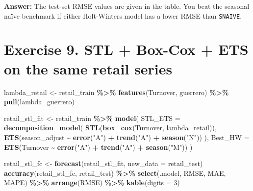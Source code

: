 \documentclass[
  11pt,
]{article}
\newenvironment{Shaded}{\begin{snugshade}}{\end{snugshade}}
\newcommand{\AttributeTok}[1]{\textcolor[rgb]{0.13,0.29,0.53}{#1}}
\newcommand{\DecValTok}[1]{\textcolor[rgb]{0.00,0.00,0.81}{#1}}
\newcommand{\FunctionTok}[1]{\textcolor[rgb]{0.13,0.29,0.53}{\textbf{#1}}}
\newcommand{\NormalTok}[1]{#1}
\newcommand{\OtherTok}[1]{\textcolor[rgb]{0.56,0.35,0.01}{#1}}
\newcommand{\SpecialCharTok}[1]{\textcolor[rgb]{0.81,0.36,0.00}{\textbf{#1}}}
\newcommand{\StringTok}[1]{\textcolor[rgb]{0.31,0.60,0.02}{#1}}
\begin{document}
\textbf{Answer:} The test-set RMSE values are given in the table. You
beat the seasonal naïve benchmark if either Holt-Winters model has a
lower RMSE than \texttt{SNAIVE}.

\section{Exercise 9. STL + Box-Cox + ETS on the same retail
series}\label{exercise-9.-stl-box-cox-ets-on-the-same-retail-series}

\begin{Shaded}
\begin{Highlighting}[]
\NormalTok{lambda\_retail }\OtherTok{\textless{}{-}}\NormalTok{ retail\_train }\SpecialCharTok{\%\textgreater{}\%} \FunctionTok{features}\NormalTok{(Turnover, guerrero) }\SpecialCharTok{\%\textgreater{}\%} \FunctionTok{pull}\NormalTok{(lambda\_guerrero)}

\NormalTok{retail\_stl\_fit }\OtherTok{\textless{}{-}}\NormalTok{ retail\_train }\SpecialCharTok{\%\textgreater{}\%}
  \FunctionTok{model}\NormalTok{(}
    \AttributeTok{STL\_ETS =} \FunctionTok{decomposition\_model}\NormalTok{(}
      \FunctionTok{STL}\NormalTok{(}\FunctionTok{box\_cox}\NormalTok{(Turnover, lambda\_retail)),}
      \FunctionTok{ETS}\NormalTok{(season\_adjust }\SpecialCharTok{\textasciitilde{}} \FunctionTok{error}\NormalTok{(}\StringTok{"A"}\NormalTok{) }\SpecialCharTok{+} \FunctionTok{trend}\NormalTok{(}\StringTok{"A"}\NormalTok{) }\SpecialCharTok{+} \FunctionTok{season}\NormalTok{(}\StringTok{"N"}\NormalTok{))}
\NormalTok{    ),}
    \AttributeTok{Best\_HW =} \FunctionTok{ETS}\NormalTok{(Turnover }\SpecialCharTok{\textasciitilde{}} \FunctionTok{error}\NormalTok{(}\StringTok{"A"}\NormalTok{) }\SpecialCharTok{+} \FunctionTok{trend}\NormalTok{(}\StringTok{"A"}\NormalTok{) }\SpecialCharTok{+} \FunctionTok{season}\NormalTok{(}\StringTok{"M"}\NormalTok{))}
\NormalTok{  )}

\NormalTok{retail\_stl\_fc }\OtherTok{\textless{}{-}} \FunctionTok{forecast}\NormalTok{(retail\_stl\_fit, }\AttributeTok{new\_data =}\NormalTok{ retail\_test)}
\FunctionTok{accuracy}\NormalTok{(retail\_stl\_fc, retail\_test) }\SpecialCharTok{\%\textgreater{}\%}
  \FunctionTok{select}\NormalTok{(.model, RMSE, MAE, MAPE) }\SpecialCharTok{\%\textgreater{}\%}
  \FunctionTok{arrange}\NormalTok{(RMSE) }\SpecialCharTok{\%\textgreater{}\%}
  \FunctionTok{kable}\NormalTok{(}\AttributeTok{digits =} \DecValTok{3}\NormalTok{)}
\end{Highlighting}
\end{Shaded}
\end{document}
